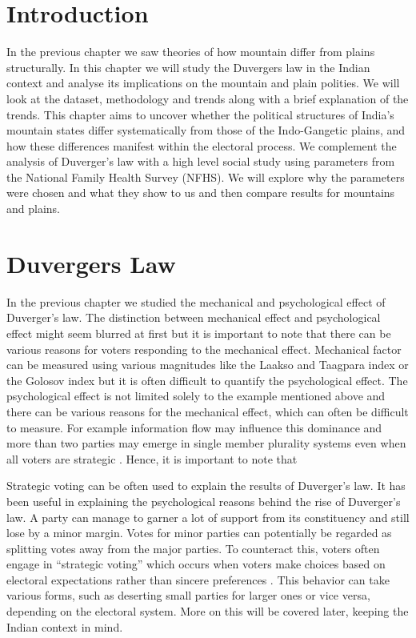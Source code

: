 \section{Introduction}
In the previous chapter we saw theories of how mountain differ from plains structurally. In this chapter we will study the Duvergers law in the Indian context and analyse its implications on the mountain and plain polities.  We will look at the dataset, methodology and trends along with a brief explanation of the trends. This chapter aims to uncover whether the political structures of India's mountain states differ systematically from those of the Indo-Gangetic plains, and how these differences manifest within the electoral process.  We complement the analysis of Duverger's law with a high level social study using parameters from the National Family Health Survey (NFHS). We will explore why the parameters were chosen and what they show to us and then compare results for mountains and plains.
\section{Duvergers Law}

In the previous chapter we studied the mechanical and psychological effect of Duverger’s law. The distinction between mechanical effect and psychological effect might seem blurred at first but it is important to note that there can be various reasons for voters responding to the mechanical effect. Mechanical factor can be measured using various magnitudes like the Laakso and Taagpara index \citep{laakso1979effective} or the Golosov index \citep{golosov2010effective} but it is often difficult to quantify the psychological effect. The psychological effect is not limited solely to the example mentioned above and there can be various reasons for the mechanical effect, which can often be difficult to measure. For example information flow may influence this dominance and more than two parties may emerge in single member plurality systems even when all voters are strategic \citep{clough2007strategic}. Hence, it is important to note that 

\vspace{0.3cm}

Strategic voting can be often used to explain the results of Duverger's law. It has been useful in explaining the psychological reasons behind the rise of Duverger's law. A party can manage to garner a lot of support from its constituency and still lose by a minor margin. Votes for minor parties can potentially be regarded as splitting votes away from the major parties. To counteract this, voters often engage in \enquote{strategic voting}  which occurs when voters make choices based on electoral expectations rather than sincere preferences \citep{Bol2019StrategicVV}. This behavior can take various forms, such as deserting small parties for larger ones or vice versa, depending on the electoral system. More on this will be covered later, keeping the Indian context in mind. 
 
